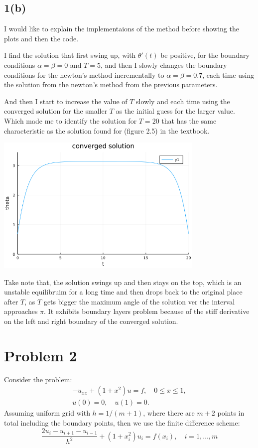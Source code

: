 \documentclass[]{article}
\begin{document}
    \subsection*{1(b)}
        \par\hspace{1.1em}
        I would like to explain the implementaions of the method before showing the plots and then the code. 
        \par
        I find the solution that first swing up, with $\theta'(t)$ be positive, for the boundary conditions $\alpha = \beta = 0$ and $T = 5$, and then I slowly changes the boundary conditions for the newton's method incrementally to $\alpha = \beta = 0.7$, each time using the solution from the newton's method from the previous parameters. 
        \par
        And then I start to increase the value of $T$ slowly and each time using the converged solution for the smaller $T$ as the initial guess for the larger value. Which made me to identify the solution for $T = 20$ that has the same characteristic as the solution found for (figure 2.5) in the textbook. 
        \begin{center}
            \includegraphics[width=10cm]{problem1(b).png}
        \end{center}
        Take note that, the solution swings up and then stays on the top, which is an unstable equilibruim for a long time and then drops back to the original place after $T$, as $T$ gets bigger the maximum angle of the solution ver the interval approaches $\pi$. It exhibits boundary layers problem because of the stiff derivative on the left and right boundary of the converged solution. 


    
    

\section*{Problem 2}
    Consider the problem: 
    \begin{align*}
        -u_{x x}+\left(1+x^{2}\right) u=f, \quad 0 \leq x \leq 1, \\
        u(0)=0, \quad u(1)=0 .
    \end{align*}
    Assuming uniform grid with $h = 1/(m + 1)$, where there are $m + 2$ points in total including the boundary points, then we use the finite difference scheme: 
    $$
        \frac{2 u_{i}-u_{i+1}-u_{i-1}}{h^{2}}+\left(1+x_{i}^{2}\right) u_{i}=f\left(x_{i}\right), \quad i=1, \ldots, m
    $$
\end{document}
